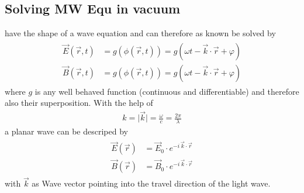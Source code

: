 \subsection{Solving MW Equ in vacuum}
% 
 have the shape of a wave equation and can therefore as known be solved by
% 
% 
\begin{align}
\begin{split} \label{eq::dgl_solution}
  \vec{E}( \vec{r}, t ) &= g(\phi( \vec{r}, t )) = g( \omega t - \vec{k} \cdot \vec{r} + \varphi)\\
  \vec{B}( \vec{r}, t ) &= g(\phi( \vec{r}, t )) = g( \omega t - \vec{k} \cdot \vec{r} + \varphi )
\end{split}
\end{align}
% 
where $g$ is any well behaved function (continuous and differentiable) and therefore also their superposition.
% 
With the help of
% 
\begin{align}
k = \mathopen| \vec{k} \mathclose| = \frac{\omega}{c} =  \frac{2 \pi}{\lambda}
\end{align}
% 
a planar wave can be descriped by
% 
\begin{align}
\begin{split} \label{eq::plane_wave}
\vec{E}(\vec{r}) &= \vec{E}_0 \cdot e^{ -i \, \vec{k} \cdot \vec{r} }\\
 \vec{B}(\vec{r}) &= \vec{B}_0 \cdot e^{ -i \, \vec{k} \cdot \vec{r} }
\end{split}
\end{align}
% 
with $\vec{k}$ as Wave vector pointing into the travel direction of the light wave.
% 
% 
